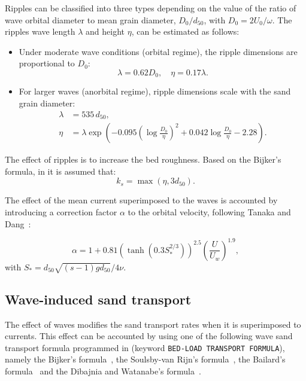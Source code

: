 Ripples can be classified into three types depending on the value of the
ratio of wave orbital diameter to mean grain diameter, $D_0/d_{50}$,
with $D_0 = 2U_0/\omega$. The ripples wave length $\lambda$ and height $\eta$, can be estimated as follows: 

\begin{itemize}
\item Under moderate wave conditions (orbital regime), the ripple dimensions are proportional to $D_0$:
\begin{equation*}
\lambda = 0.62D_0, \quad \eta = 0.17\lambda.
\end{equation*}
\item For larger waves (anorbital regime), ripple dimensions scale with the sand grain diameter:
\begin{align*}
\lambda &= 535\,d_{50}, \\
\eta &= \lambda \exp \left(-0.095\left(\log\frac{D_0}{\eta} \right)^2
 + 0.042\log\frac{D_0}{\eta}-2.28\right). 
\end{align*}
\end{itemize}
The effect of ripples is to increase the bed roughness. Based on the Bijker's
formula, in \sisyphe it is assumed that:
\begin{equation*}
k_s = \max \left(\eta ,3d_{50} \right). 
\end{equation*}

The effect of the mean current superimposed to the waves is accounted by
introducing a correction factor $\alpha$ to the orbital velocity,
following Tanaka and Dang~\cite{Tanaka}:

\begin{equation*}
\alpha = 1 + 0.81\left(\tanh (0.3S_*^{2/3})\right)^{2.5}
\left(\frac{U}{U_w}\right)^{1.9}, 
\end{equation*}
with $S_* = d_{50}\sqrt{(s-1)g d_{50}}/4\nu$. 

\subsection{Wave-induced sand transport}
The effect of waves modifies the sand transport rates when it is superimposed to currents. 
This effect can be accounted by using one of the following wave sand transport formula programmed
in \sisyphe (keyword \texttt{BED-LOAD TRANSPORT FORMULA}), namely the Bijker's formula~\cite{Bijker}, the Soulsby-van Rijn's formula~\cite{Soulsby}, the Bailard's formula~\cite{13} and the Dibajnia and Watanabe's formula~\cite{Dibajnia}.

